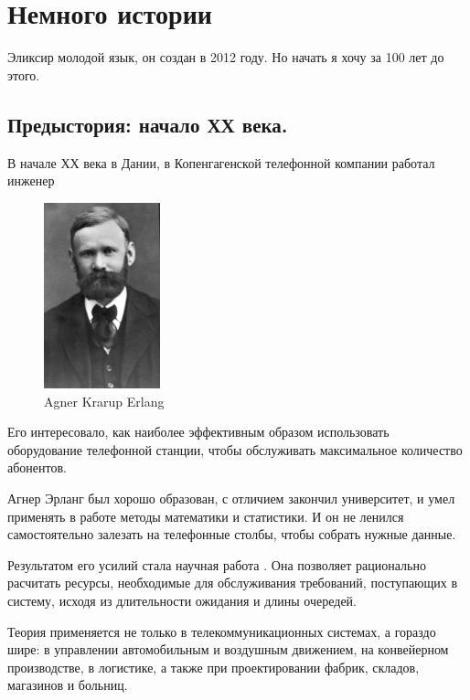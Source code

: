 \chapter{Немного истории}

Эликсир молодой язык, он создан в 2012 году. Но начать я хочу за 100 лет до этого.

\section{Предыстория: начало ХХ века.}

В начале ХХ века в Дании, в Копенгагенской телефонной компании работал инженер 

\begin{figure}[h]
  \centering
  \includegraphics[width=0.3\textwidth]{../lesson_02/img/agner_krarup_erlang.jpg}
  \caption{Agner Krarup Erlang}
\end{figure}

Его интересовало, как наиболее эффективным образом использовать оборудование телефонной станции, чтобы обслуживать максимальное количество абонентов.

Агнер Эрланг был хорошо образован, с отличием закончил университет, и умел применять в работе методы математики и статистики. И он не ленился самостоятельно залезать на телефонные столбы, чтобы собрать нужные данные.

Результатом его усилий стала научная работа . Она позволяет рационально расчитать ресурсы, необходимые для обслуживания требований, поступающих в систему, исходя из длительности ожидания и длины очередей.

Теория применяется не только в телекоммуникационных системах, а гораздо шире: в управлении автомобильным и воздушным движением, на конвейерном производстве, в логистике, а также при проектировании фабрик, складов, магазинов и больниц.

